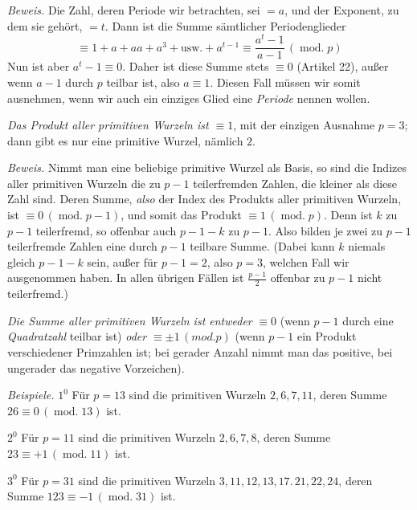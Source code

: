 \emph{Beweis.} Die Zahl, deren Periode wir betrachten, sei $=a$, und der Exponent, zu dem sie gehört, $=t$. Dann ist die Summe sämtlicher Periodenglieder
\[\equiv1+a+aa+a^3+\text{usw.}+a^{t-1}\equiv\frac{a^t-1}{a-1}\,(\operatorname{mod.}p)\]
Nun ist aber $a^t-1\equiv0$. Daher ist diese Summe stets $\equiv0$ (Artikel 22), außer wenn $a-1$ durch $p$ teilbar ist, also $a\equiv1$. Diesen Fall müssen wir somit ausnehmen, wenn wir auch ein einziges Glied eine \emph{Periode} nennen wollen.

\emph{Das Produkt aller primitiven Wurzeln ist $\equiv1$}, mit der einzigen Ausnahme $p=3$; dann gibt es nur eine primitive Wurzel, nämlich $2$.

\emph{Beweis.} Nimmt man eine beliebige primitive Wurzel als Basis, so sind die Indizes aller primitiven Wurzeln die zu $p-1$ teilerfremden Zahlen, die kleiner als diese Zahl sind. Deren Summe, \emph{also} der Index des Produkts aller primitiven Wurzeln, ist $\equiv0\,(\operatorname{mod.}p-1)$, und somit das Produkt $\equiv1\,(\operatorname{mod.}p)$. Denn ist $k$ zu $p-1$ teilerfremd, so offenbar auch $p-1-k$ zu $p-1$. Also bilden je zwei zu $p-1$ teilerfremde Zahlen eine durch $p-1$ teilbare Summe. (Dabei kann $k$ niemals gleich $p-1-k$ sein, außer für $p-1=2$, also $p=3$, welchen Fall wir ausgenommen haben. In allen übrigen Fällen ist $\frac{p-1}{2}$ offenbar zu $p-1$ nicht teilerfremd.)

\emph{Die Summe aller primitiven Wurzeln ist entweder} $\equiv0$ (wenn $p-1$ durch eine \emph{Quadratzahl} teilbar ist) \emph{oder $\equiv\pm1\,(\mathit{mod.}p)$} (wenn $p-1$ ein Produkt verschiedener Primzahlen ist; bei gerader Anzahl nimmt man das positive, bei ungerader das negative Vorzeichen).

\emph{Beispiele.} $1^0$ Für $p=13$ sind die primitiven Wurzeln $2,6,7,11$, deren Summe $26\equiv0\,(\operatorname{mod.}13)$ ist.

$2^0$ Für $p=11$ sind die primitiven Wurzeln $2,6,7,8$, deren Summe $23\equiv+1\,(\operatorname{mod.}11)$ ist.

$3^0$ Für $p=31$ sind die primitiven Wurzeln $3,11,12,13,17.\,21,22,24$, deren Summe $123\equiv-1\,(\operatorname{mod.}31)$ ist.

